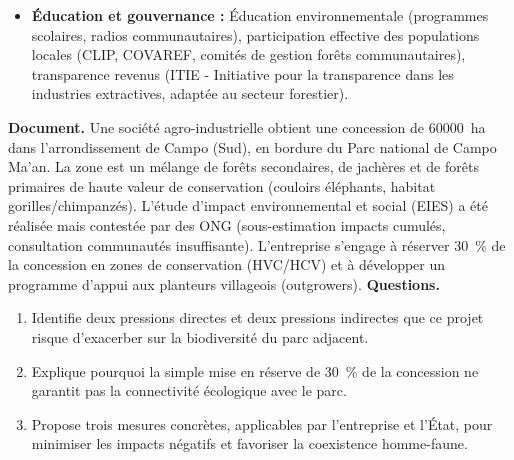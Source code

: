 \documentclass[11pt]{article}
\begin{document}
\begin{aretenir}
\begin{itemize}
    \item \textbf{Éducation et gouvernance :} Éducation environnementale (programmes scolaires, radios communautaires), participation effective des populations locales (CLIP, COVAREF, comités de gestion forêts communautaires), transparence revenus (ITIE - Initiative pour la transparence dans les industries extractives, adaptée au secteur forestier).
\end{itemize}
\end{aretenir}

\begin{exercice}
\textbf{Document.} Une société agro-industrielle obtient une concession de \SI{60000}{ha} dans l'arrondissement de Campo (Sud), en bordure du Parc national de Campo Ma'an. La zone est un mélange de forêts secondaires, de jachères et de forêts primaires de haute valeur de conservation (couloirs éléphants, habitat gorilles/chimpanzés). L'étude d'impact environnemental et social (EIES) a été réalisée mais contestée par des ONG (sous-estimation impacts cumulés, consultation communautés insuffisante). L'entreprise s'engage à réserver \SI{30}{\%} de la concession en zones de conservation (HVC/HCV) et à développer un programme d'appui aux planteurs villageois (outgrowers).
\textbf{Questions.}
\begin{enumerate}
    \item Identifie deux pressions directes et deux pressions indirectes que ce projet risque d'exacerber sur la biodiversité du parc adjacent.
    \item Explique pourquoi la simple mise en réserve de \SI{30}{\%} de la concession ne garantit pas la connectivité écologique avec le parc.
    \item Propose trois mesures concrètes, applicables par l'entreprise et l'État, pour minimiser les impacts négatifs et favoriser la coexistence homme-faune.
\end{enumerate}
\end{exercice}
\end{document}
